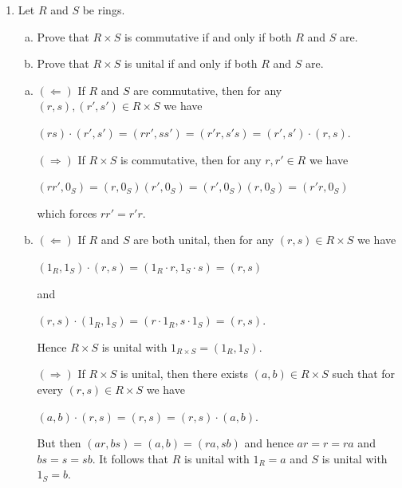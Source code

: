 \documentclass[11pt,fleqn,dvipsnames,usenames]{article}
\begin{document}
\begin{enumerate}[1.]
\item Let $R$ and $S$ be rings.
\begin{enumerate}[(a)]
\item Prove that $R\times S$ is commutative if and only if both $R$ and $S$ are.
\item Prove that $R\times S$ is unital if and only if both $R$ and $S$ are.
\end{enumerate}
\vsmsp

\solution
\begin{enumerate}[(a)]
\item $(\Leftarrow)$ If $R$ and $S$ are commutative, then for any $(r,s), (r',s')\in R\times S$ we have
\begin{center}
$(rs)\cdot (r',s') = (rr',ss') = (r'r, s's) = (r',s')\cdot (r,s)$.
\end{center}
$(\Rightarrow)$ If $R\times S$ is commutative, then for any $r,r'\in R$ we have
\begin{center}
$(rr',0_{S}) = (r,0_{S})(r',0_{S}) =  (r',0_{S})(r,0_{S}) = (r'r, 0_{S})$
\end{center}
which forces $rr' = r'r$.
\item $(\Leftarrow)$ If $R$ and $S$ are both unital, then for any $(r,s)\in R\times S$ we have
\begin{center}
$(1_{R},1_{S})\cdot (r,s) = (1_{R}\cdot r, 1_{S}\cdot s) = (r,s)$
\end{center}
and
\begin{center}
$(r,s)\cdot(1_{R},1_{S}) = (r\cdot 1_{R},s\cdot 1_{S}) = (r,s)$.
\end{center}
Hence $R\times S$ is unital with $1_{R\times S} = (1_{R},1_{S})$.

$(\Rightarrow)$ If $R\times S$ is unital, then there exists $(a,b)\in R\times S$ such that for every $(r,s)\in R\times S$ we have
\begin{center}
$(a,b)\cdot (r,s) = (r,s) = (r,s)\cdot (a,b)$.
\end{center}
But then $(ar,bs) = (a,b) = (ra,sb)$ and hence $ar = r = ra$ and $bs = s = sb$.  It follows that $R$ is unital with $1_{R} = a$ and $S$ is unital with $1_{S} = b$.
\end{enumerate}


\end{enumerate}
\end{document}
